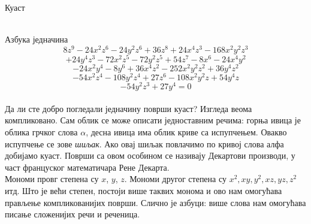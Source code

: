 \documentclass[sr]{./../../common/SurferDesc}%
\begin{document}
\footnotesize





\begin{surferPage}
  \begin{surferTitle}Куаст\end{surferTitle} \\
Азбука једначина
  \smallskip
\[8z^9-24x^2z^6-24y^2z^6+36z^8+24x^4z^3-168x^2y^2z^3\]
\[+24y^4z^3-72x^2z^5-72y^2z^5+54z^7-8x^6-24x^4y^2\]
\[-24x^2y^4-8y^6 + 36x^4z^2-252x^2y^2z^2+36y^4z^2\]
\[- 54x^2z^4-108y^2z^4 + 27z^6-108x^2y^2z + 54y^4z\]
\[-54y^2z^3 + 27y^4 = 0\]\\
\vspace{0.3cm}
Да ли сте добро погледали једначину површи куаст? Изгледа веома компликовано. Сам облик се може описати једноставним речима: горња ивица је облика грчког слова $\alpha$, десна ивица има облик криве са испупчењем. Овакво испупчење се зове {\it шиљак}. Ако овај шиљак  повлачимо по кривој слова алфа добијамо куаст. Површи са овом особином се називају Декартови производи, у част француског математичара Рене Декарта.\\
\vspace{0.3cm}
Мономи провг степена су $x$, $y$, $z$. Мономи другог степена су $x^2, xy, y^2, xz, yz, z^2$ итд. Што је већи степен, постоји више таквих монома и ово нам омогућава прављење компликованијих површи. Слично је азбуци: више слова нам омогућава писање сложенијих речи и реченица. 




  \begin{surferText}
     \end{surferText}
\end{surferPage}
\end{document}
